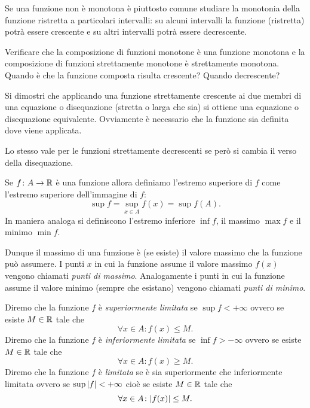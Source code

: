 Se una funzione non è monotona è piuttosto comune studiare 
la monotonia della funzione ristretta a particolari intervalli: 
su alcuni intervalli la funzione (ristretta) potrà essere crescente e su altri 
intervalli potrà essere decrescente.

\begin{exercise}
Verificare che la composizione di funzioni monotone è una
funzione monotona e la composizione di funzioni strettamente
monotone è strettamente monotona.
Quando è che la funzione composta risulta crescente?
Quando decrescente?
\end{exercise}

\begin{exercise}
Si dimostri che applicando una funzione strettamente crescente ai due
membri di una equazione o disequazione (stretta o larga che sia)
si ottiene una equazione o disequazione equivalente.
Ovviamente è necessario che la funzione sia definita dove viene applicata.

Lo stesso vale per le funzioni strettamente decrescenti 
se però si cambia il verso della disequazione.
\end{exercise}

\begin{definition}
\label{def:funzione_limitata}%
Se $f\colon A \to {\mathbb R}$ è una funzione allora definiamo
l'estremo superiore di $f$ come l'estremo superiore
dell'immagine di $f$:
\[
  \sup f = \sup_{x\in A} f(x) = \sup f(A).
\]
In maniera analoga si definiscono l'estremo inferiore $\inf f$,
il massimo $\max f$ e il minimo $\min f$.

Dunque il massimo di una funzione è (se esiste) il valore massimo
che la funzione può assumere. I punti $x$ in cui
la funzione assume il valore massimo $f(x)$ vengono chiamati
\emph{punti di massimo}.
%
%
%
%
Analogamente i punti in cui la funzione
assume il valore minimo (sempre che esistano) vengono
chiamati \emph{punti di minimo}.

Diremo che la funzione $f$ è
\emph{superiormente limitata}%
%
se $\sup f<+\infty$
ovvero se esiste $M\in {\mathbb R}$ tale che
\[
\forall x\in A \colon f(x) \le M.
\]
Diremo che la funzione $f$ è
\emph{inferiormente limitata}%
%
se $\inf f > -\infty$ ovvero se esiste $M\in {\mathbb R}$ tale che
\[
 \forall x \in A \colon f(x) \ge M.
\]
Diremo che la funzione $f$ è \emph{limitata}%
%
se è sia superiormente che inferiormente limitata ovvero
se $\sup{\left|f\right|}<+\infty$ cioè se esiste $M\in {\mathbb R}$ tale che
\[
\forall x \in A \colon {\left|f(x)\right|}\le M.
\]
\end{definition}

